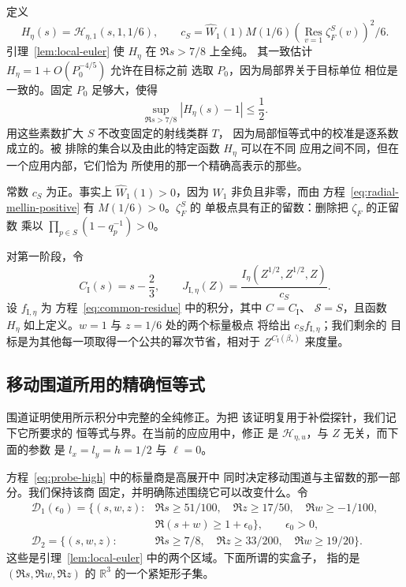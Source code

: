 定义
\begin{equation}
 H_\eta(s)=\mathcal H_{\eta,1}(s,1,1/6),\qquad
 c_S=\widehat W_1(1)M(1/6)
       \left(\operatorname*{Res}_{v=1}\zeta_F^S(v)\right)^2/6.
 \label{eq:shared-principal-data}
\end{equation}
引理~\ref{lem:local-euler} 使 $H_\eta$ 在 $\Re s>7/8$ 上全纯。
其一致估计 $H_\eta=1+O(P_0^{-4/5})$ 允许在目标之前
选取 $P_0$，因为局部界关于目标单位
相位是一致的。固定 $P_0$ 足够大，使得
\begin{equation}
 \sup_{\Re s>7/8}|H_\eta(s)-1|\le\frac12.
 \label{eq:shared-principal-nonvanishing}
\end{equation}
用这些素数扩大 $S$ 不改变固定的射线类群 $T$，
因为局部恒等式中的校准是逐系数成立的。被
排除的集合以及由此的特定函数 $H_\eta$ 可以在不同
应用之间不同，但在一个应用内部，它们恰为
所使用的那一个精确高表示的那些。

常数 $c_S$ 为正。事实上 $\widehat W_1(1)>0$，因为
$W_1$ 非负且非零，而由
方程~\eqref{eq:radial-mellin-positive} 有 $M(1/6)>0$。$\zeta_F^S$ 的
单极点具有正的留数：删除把 $\zeta_F$ 的正留数
乘以 $\prod_{p\in S}(1-q_p^{-1})>0$。

对第一阶段，令
\[
 C_{\mathrm I}(s)=s-\frac23,\qquad
 J_{\mathrm I,\eta}(Z)=\frac{I_\eta(Z^{1/2},Z^{1/2},Z)}{c_S}.
\]
设 $f_{\mathrm I,\eta}$ 为
方程~\eqref{eq:common-residue} 中的积分，其中 $C=C_{\mathrm I}$、
$\mathcal S=S$，且函数 $H_\eta$ 如上定义。$w=1$ 与 $z=1/6$ 处的两个标量极点
将给出 $c_S f_{\mathrm I,\eta}$；我们剩余的
目标是为其他每一项取得一个公共的幂次节省，相对于
$Z^{C_{\mathrm I}(\beta_*)}$ 来度量。

\subsection{移动围道所用的精确恒等式}

围道证明使用所示积分中完整的全纯修正。为把
该证明复用于补偿探针，我们记下它所要求的
恒等式与界。在当前的应应用中，修正
是 $\mathcal H_{\eta,u}$，与 $Z$ 无关，而下面的参数
是 $l_x=l_y=h=1/2$ 与 $\ell=0$。

方程~\eqref{eq:probe-high} 中的标量商是高展开中
同时决定移动围道与主留数的那一部分。我们保持该商
固定，并明确陈述围绕它可以改变什么。令
\[
 \begin{split}
 \mathcal D_1(\epsilon_0)=\{(s,w,z):{}&\Re s\ge51/100,\quad
       \Re z\ge17/50,\quad \Re w\ge-1/100,\\
       &\Re(s+w)\ge1+\epsilon_0\},\qquad \epsilon_0>0,\\
 \mathcal D_2=\{(s,w,z):{}&\Re s\ge7/8,\quad
       \Re z\ge33/200,\quad \Re w\ge19/20\}.
 \end{split}
\]
这些是引理~\ref{lem:local-euler} 中的两个区域。下面所谓的实盒子，
指的是 $(\Re s,\Re w,\Re z)$ 的 $\mathbb R^3$ 的一个紧矩形子集。
